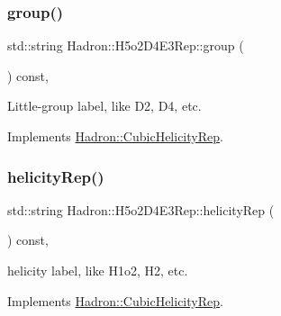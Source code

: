 \mbox{\label{structHadron_1_1H5o2D4E3Rep_a5761659c1554a5eadb627eb60ce49afa}} 
\subsubsection{\texorpdfstring{group()}{group()}\hspace{0.1cm}{\footnotesize\ttfamily [5/5]}}
{\footnotesize\ttfamily std\+::string Hadron\+::\+H5o2\+D4\+E3\+Rep\+::group (\begin{DoxyParamCaption}{ }\end{DoxyParamCaption}) const\hspace{0.3cm}{\ttfamily [inline]}, {\ttfamily [virtual]}}

Little-\/group label, like D2, D4, etc. 

Implements \mbox{\hyperlink{structHadron_1_1CubicHelicityRep_a101a7d76cd8ccdad0f272db44b766113}{Hadron\+::\+Cubic\+Helicity\+Rep}}.

\mbox{\label{structHadron_1_1H5o2D4E3Rep_a71af11dde163357e0254fa7736f41250}} 
\subsubsection{\texorpdfstring{helicityRep()}{helicityRep()}\hspace{0.1cm}{\footnotesize\ttfamily [1/3]}}
{\footnotesize\ttfamily std\+::string Hadron\+::\+H5o2\+D4\+E3\+Rep\+::helicity\+Rep (\begin{DoxyParamCaption}{ }\end{DoxyParamCaption}) const\hspace{0.3cm}{\ttfamily [inline]}, {\ttfamily [virtual]}}

helicity label, like H1o2, H2, etc. 

Implements \mbox{\hyperlink{structHadron_1_1CubicHelicityRep_af1096946b7470edf0a55451cc662f231}{Hadron\+::\+Cubic\+Helicity\+Rep}}.

\mbox{\label{structHadron_1_1H5o2D4E3Rep_a71af11dde163357e0254fa7736f41250}} 
